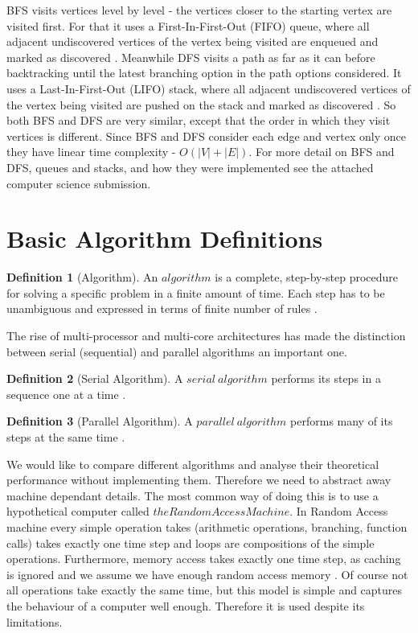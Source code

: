 \documentclass{report}
\theoremstyle{plain}
\theoremstyle{definition}
\newtheorem{definition}{Definition}
\theoremstyle{remark}
\numberwithin{definition}{chapter}
\numberwithin{example}{chapter}
\numberwithin{figure}{chapter}
\numberwithin{theorem}{chapter}
\numberwithin{lemma}{chapter}
\begin{document}
BFS visits vertices level by level - the vertices closer to the starting vertex are visited first. For that it uses a First-In-First-Out (FIFO) queue, where all adjacent undiscovered vertices of the vertex being visited are enqueued and marked as discovered \cite{c++_sedgewick}. Meanwhile DFS visits a path as far as it can before backtracking until the latest branching option in the path options considered. It uses a Last-In-First-Out (LIFO) stack, where all adjacent undiscovered vertices of the vertex being visited are pushed on the stack and marked as discovered \cite{c++_sedgewick}. So both BFS and DFS are very similar, except that the order in which they visit vertices is different. Since BFS and DFS consider each edge and vertex only once they have linear time complexity - $O(|V| + |E|)$. For more detail on BFS and DFS, queues and stacks, and how they were implemented see the attached computer science submission.

\section{Basic Algorithm Definitions}

\begin{definition}[Algorithm]
An $algorithm$ is a complete, step-by-step procedure for solving a specific problem in a finite amount of time. Each step has to be unambiguous and expressed in terms of finite number of rules \cite{berman1996fundamentals}.
\end{definition}

The rise of multi-processor and multi-core architectures has made the distinction between serial (sequential) and parallel algorithms an important one.

\begin{definition}[Serial Algorithm]
A $serial \ algorithm$ performs its steps in a sequence one at a time \cite{berman1996fundamentals}.
\end{definition}

\begin{definition}[Parallel Algorithm]
A $parallel \ algorithm$ performs many of its steps at the same time \cite{berman1996fundamentals}.
\end{definition}

We would like to compare different algorithms and analyse their theoretical performance without implementing them. Therefore we need to abstract away machine dependant details. The most common way of doing this is to use a hypothetical computer called $the Random Access Machine$. In Random Access machine every simple operation takes (arithmetic operations, branching, function calls) takes exactly one time step and loops are compositions of the simple operations. Furthermore, memory access takes exactly one time step, as caching is ignored and we assume we have enough random access memory \cite{skiena504algorithm}. Of course not all operations take exactly the same time, but this model is simple and captures the behaviour of a computer well enough. Therefore it is used despite its limitations.
\end{document}
